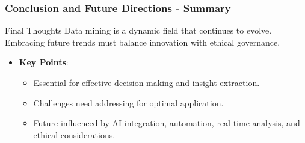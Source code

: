 \documentclass[aspectratio=169]{beamer}
\begin{document}
\begin{frame}[fragile]
    \frametitle{Conclusion and Future Directions - Summary}
    \begin{block}{Final Thoughts}
        Data mining is a dynamic field that continues to evolve. Embracing future trends must balance innovation with ethical governance.
    \end{block}
    \begin{itemize}
        \item \textbf{Key Points}:
        \begin{itemize}
            \item Essential for effective decision-making and insight extraction.
            \item Challenges need addressing for optimal application.
            \item Future influenced by AI integration, automation, real-time analysis, and ethical considerations.
        \end{itemize}
    \end{itemize}
\end{frame}
\end{document}
